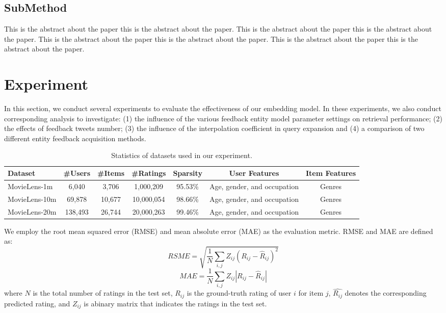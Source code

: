 \documentclass{sig-alternate-05-2015}
\begin{document}
\subsection{SubMethod}
This is the abstract about the paper this is the abstract about the paper.
This is the abstract about the paper this is the abstract about the paper.
This is the abstract about the paper this is the abstract about the paper.
This is the abstract about the paper this is the abstract about the paper.

\section{Experiment}
In this section, we conduct several experiments to evaluate the effectiveness of our embedding model.
In these experiments, we also conduct corresponding analysis to investigate:
(1) the influence of the various feedback entity model parameter settings on
retrieval performance;
(2) the effects of feedback tweets number;
(3) the influence of the interpolation coefficient in query expansion and
(4) a comparison of two different entity feedback acquisition methods.

\begin{table*}[htpb]
	\centering
	\caption{Statistics of datasets used in our experiment.}
	\label{tab:topics}
	\begin{tabular}{|l|c|c|c|c|c|c|}
		\hline
		\textbf{Dataset} & \textbf{\#Users} & \textbf{\#Items} & \textbf{\#Ratings} & \textbf{Sparsity} & \textbf{User Features} & \textbf{Item Features} \\
		\hline
		MovieLens-1m  & 6,040   & 3,706  & 1,000,209  & 95.53\% & Age, gender, and occupation & Genres \\
		MovieLens-10m & 69,878  & 10,677 & 10,000,054 & 98.66\% & Age, gender, and occupation & Genres \\
		MovieLens-20m & 138,493 & 26,744 & 20,000,263 & 99.46\% & Age, gender, and occupation & Genres \\
		\hline
	\end{tabular}
\end{table*}

We employ the root mean squared error (RMSE) and mean absolute error (MAE) as the evaluation metric.
RMSE and MAE are defined as:
$$ RSME = \sqrt{ \frac{1}{N} \sum_{i,j} Z_{ij} (R_{ij} - \hat{R}_{ij})^2 } $$
$$ MAE = \frac{1}{N} \sum_{i,j} Z_{ij} |R_{ij} - \hat{R}_{ij}| $$
where $N$ is the total number of ratings in the test set,
$R_{ij}$ is the ground-truth rating of user $i$ for item $j$,
$\hat{R_{ij}}$ denotes the corresponding predicted rating,
and $Z_{ij}$ is abinary matrix that indicates the ratings in the test set.
\end{document}
